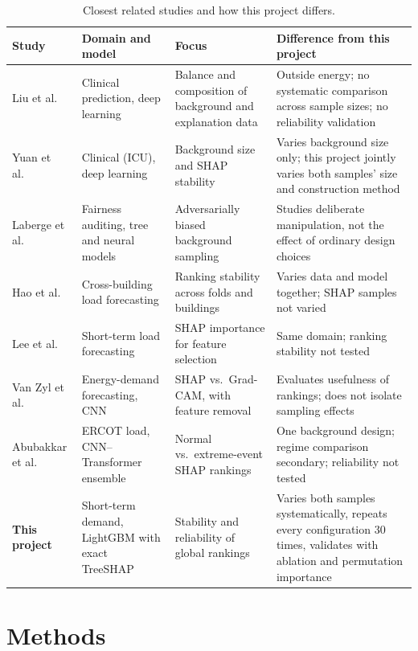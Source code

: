 \documentclass[11pt,a4paper]{article}
\begin{document}
\begin{table}[htbp]
\centering\small
\caption{Closest related studies and how this project differs.}
\label{tab:gap}
\begin{tabularx}{\linewidth}{>{\raggedright\arraybackslash}p{2.3cm} >{\raggedright\arraybackslash}p{2.9cm} L L}
\toprule
Study & Domain and model & Focus & Difference from this project \\
\midrule
Liu et al.~\cite{liu2022} & Clinical prediction, deep learning & Balance and composition of background and explanation data & Outside energy; no systematic comparison across sample sizes; no reliability validation \\
Yuan et al.~\cite{yuan2023} & Clinical (ICU), deep learning & Background size and SHAP stability & Varies background size only; this project jointly varies both samples' size and construction method \\
Laberge et al.~\cite{laberge2023} & Fairness auditing, tree and neural models & Adversarially biased background sampling & Studies deliberate manipulation, not the effect of ordinary design choices \\
Hao et al.~\cite{hao2026} & Cross-building load forecasting & Ranking stability across folds and buildings & Varies data and model together; SHAP samples not varied \\
Lee et al.~\cite{lee2023} & Short-term load forecasting & SHAP importance for feature selection & Same domain; ranking stability not tested \\
Van Zyl et al.~\cite{vanzyl2024} & Energy-demand forecasting, CNN & SHAP vs.\ Grad-CAM, with feature removal & Evaluates usefulness of rankings; does not isolate sampling effects \\
Abubakkar et al.~\cite{abubakkar2026} & ERCOT load, CNN--Transformer ensemble & Normal vs.\ extreme-event SHAP rankings & One background design; regime comparison secondary; reliability not tested \\
\textbf{This project} & Short-term demand, LightGBM with exact TreeSHAP & Stability and reliability of global rankings & Varies both samples systematically, repeats every configuration 30 times, validates with ablation and permutation importance \\
\bottomrule
\end{tabularx}
\end{table}

\section{Methods}\label{sec:methods}
\end{document}

